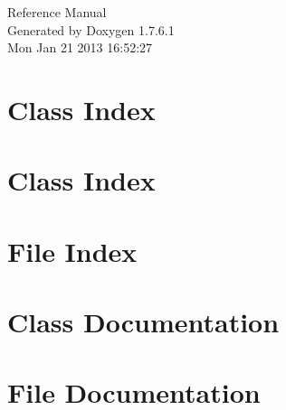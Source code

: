 \documentclass[a4paper]{book}
\begin{document}
\hypersetup{pageanchor=false,citecolor=blue}
\begin{titlepage}
\vspace*{7cm}
\begin{center}
{\Large \-Reference \-Manual}\\
\vspace*{1cm}
{\large \-Generated by Doxygen 1.7.6.1}\\
\vspace*{0.5cm}
{\small Mon Jan 21 2013 16:52:27}\\
\end{center}
\end{titlepage}
\clearemptydoublepage
{}
\tableofcontents
\clearemptydoublepage
{}
\hypersetup{pageanchor=true,citecolor=blue}
\chapter{\-Class \-Index}

\chapter{\-Class \-Index}

\chapter{\-File \-Index}

\chapter{\-Class \-Documentation}

















\chapter{\-File \-Documentation}

























\printindex
\end{document}

